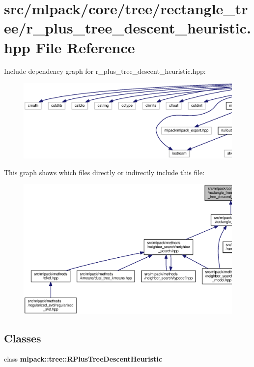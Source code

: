 \section{src/mlpack/core/tree/rectangle\+\_\+tree/r\+\_\+plus\+\_\+tree\+\_\+descent\+\_\+heuristic.hpp File Reference}
\label{r__plus__tree__descent__heuristic_8hpp}
Include dependency graph for r\+\_\+plus\+\_\+tree\+\_\+descent\+\_\+heuristic.\+hpp\+:
\nopagebreak
\begin{figure}[H]
\begin{center}
\leavevmode
\includegraphics[width=350pt]{r__plus__tree__descent__heuristic_8hpp__incl}
\end{center}
\end{figure}
This graph shows which files directly or indirectly include this file\+:
\nopagebreak
\begin{figure}[H]
\begin{center}
\leavevmode
\includegraphics[width=350pt]{r__plus__tree__descent__heuristic_8hpp__dep__incl}
\end{center}
\end{figure}
\subsection*{Classes}
\begin{DoxyCompactItemize}
\item 
class {\bf mlpack\+::tree\+::\+R\+Plus\+Tree\+Descent\+Heuristic}
\end{DoxyCompactItemize}
